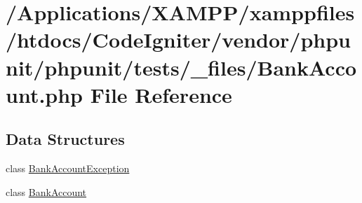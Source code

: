 \hypertarget{phpunit_2tests_2__files_2_bank_account_8php}{}\section{/\+Applications/\+X\+A\+M\+P\+P/xamppfiles/htdocs/\+Code\+Igniter/vendor/phpunit/phpunit/tests/\+\_\+files/\+Bank\+Account.php File Reference}
\label{phpunit_2tests_2__files_2_bank_account_8php}
\subsection*{Data Structures}
\begin{DoxyCompactItemize}
\item 
class \mbox{\hyperlink{class_bank_account_exception}{Bank\+Account\+Exception}}
\item 
class \mbox{\hyperlink{class_bank_account}{Bank\+Account}}
\end{DoxyCompactItemize}
